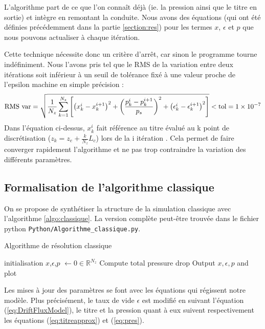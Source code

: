 L'algorithme part de ce que l'on connaît déjà (ie. la pression ainsi que le titre en sortie) et intègre en \og remontant \fg{} la conduite. Nous avons des équations (qui ont été définies précédemment dans la partie \ref{section:res}) pour les termes $x$, $\epsilon$ et $p$ que nous pouvons actualiser à chaque itération.\\ \par
Cette technique nécessite donc un critère d'arrêt, car sinon le programme tourne indéfiniment. Nous l'avons pris tel que le RMS de la variation entre deux itérations soit inférieur à un seuil de tolérance fixé à une valeur proche de l'epsilon machine en simple précision :
\begin{equation}
    \textnormal{RMS var} = \sqrt{\frac{1}{N_z}\sum_{k=1}^{N_z}\left[\left(x^{i}_k-x^{i+1}_k\right)^2 + \left(\frac{p^i_k- p^{i+1}_k}{p_s} \right)^2 + \left(\epsilon^i_k - \epsilon^{i+1}_k \right)^2\right]} <  \textnormal{tol} =\num{1e-7}
\end{equation}
Dans l'équation ci-dessus, $x^i_k$ fait référence au titre évalué au k point de discrétisation ($z_k = z_e + \frac{k}{N_z}L_c$) lors de la i itération . Cela permet de faire converger rapidement l'algorithme et ne pas trop contraindre la variation des différents paramètres.


\subsection{Formalisation de l'algorithme classique}

On se propose de synthétiser la structure de la simulation classique avec l'algorithme \ref{algo:classique}. La version complète peut-être trouvée dans le fichier python \verb|Python/Algorithme_classique.py|.

\begin{algorithm}
\label{algo:classique}
\caption{Algorithme de résolution classique}
\SetAlgoLined
{}
initialisation\;
$x$,$\epsilon$,$p$ $\leftarrow 0 \in \mathbb{R}^{N_z}$ \;
Compute total pressure drop\;
Output $x,\epsilon,p$ and plot\;
\end{algorithm}
Les mises à jour des paramètres se font avec les équations qui régissent notre modèle. Plus précisément, le taux de vide $\epsilon$ est modifié en suivant l'équation (\ref{eq:DriftFluxModel}), le titre et la pression quant à eux suivent respectivement les équations (\ref{eq:titreapprox}) et (\ref{eq:pres}).

